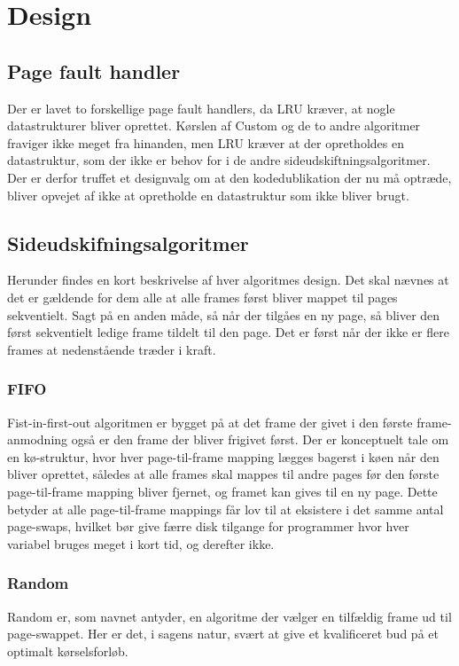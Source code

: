 \section{Design}

\subsection{Page fault handler}
Der er lavet to forskellige page fault handlers, da LRU kræver, at nogle datastrukturer bliver oprettet. Kørslen af Custom og de to andre algoritmer fraviger ikke meget fra hinanden, men LRU kræver at der opretholdes en datastruktur, som der ikke er behov for i de andre sideudskiftningsalgoritmer. Der er derfor truffet et designvalg om at den kodedublikation der nu må optræde, bliver opvejet af ikke at opretholde en datastruktur som ikke bliver brugt.  

\subsection{Sideudskifningsalgoritmer}
Herunder findes en kort beskrivelse af hver algoritmes design. Det skal nævnes at det er gældende for dem alle at alle frames først bliver mappet til pages sekventielt. Sagt på en anden måde, så når der tilgåes en ny page, så bliver den først sekventielt ledige frame tildelt til den page. Det er først når der ikke er flere frames at nedenstående træder i kraft.   
	\subsubsection{FIFO}
	Fist-in-first-out algoritmen er bygget på at det frame der givet i den første frame-anmodning også er den frame der bliver frigivet først. Der er konceptuelt tale om en kø-struktur, hvor hver page-til-frame mapping lægges bagerst i køen når den bliver oprettet, således at alle frames skal mappes til andre pages før den første page-til-frame mapping bliver fjernet, og framet kan gives til en ny page. Dette betyder at alle page-til-frame mappings får lov til at eksistere i det samme antal page-swaps, hvilket bør give færre disk tilgange for programmer hvor hver variabel bruges meget i kort tid, og derefter ikke. 
	\subsubsection{Random}
	Random er, som navnet antyder, en algoritme der vælger en tilfældig frame ud til page-swappet. Her er det, i sagens natur, svært at give et kvalificeret bud på et optimalt kørselsforløb.
